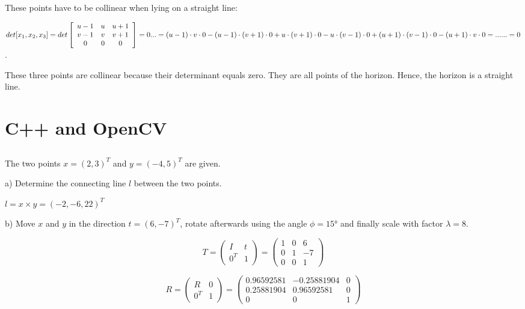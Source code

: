 \documentclass[a4paper,headings=small]{scrartcl}
\numberwithin{equation}{section} %
\numberwithin{figure}{section}   %
\begin{document}
These points have to be collinear when lying on a straight line:

$det[x_{1}, x_{2}, x_{3}] =
det\left[ \begin{array}{ccc}
u-1 & u & u+1\\
v-1 & v & v+1\\
0 & 0 & 0\end{array} \right] = 0 \\
... = (u-1) \cdot v \cdot0 - (u-1) \cdot (v+1) \cdot 0 + u \cdot (v+1) \cdot 0 - u \cdot (v-1) \cdot 0
+(u+1) \cdot (v-1) \cdot 0 - (u+1) \cdot v \cdot 0=... \\
...= 0$.

These three points are collinear because their determinant equals zero.
They are all points of the horizon.
Hence, the horizon is a straight line.

\newpage
\section{C++ and OpenCV}


\subsection{}

The two points $x = (2, 3)^T$ and $y = (-4, 5)^T$ are given.

a) Determine the connecting line $l$ between the two points.

      $l=x \times y=(-2,-6, 22)^T$

b) Move $x$ and $y$ in the direction $t = (6, -7)^T$,
rotate afterwards using the angle $\phi = 15°$ and finally
scale with factor $\lambda = 8$.

\[T =
\left( \begin{array}{cc}
I & t \\
0^T & 1   \end{array} \right)
=
\left( \begin{array}{ccc}
1 & 0 &  6 \\
0 & 1 & -7 \\
0 & 0 &  1  \end{array} \right)\]

\[R =
\left( \begin{array}{cc}
R & 0  \\
0^T & 1   \end{array} \right)
=
\left( \begin{array}{ccc}
  0.96592581 & -0.25881904 & 0 \\
  0.25881904 &  0.96592581 & 0 \\
  0          &  0          & 1  \end{array} \right)\]
\end{document}
